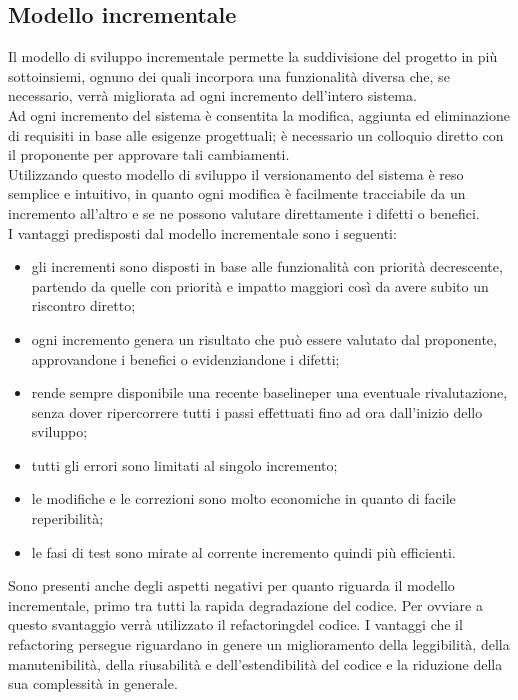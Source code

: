 \subsection{Modello incrementale}
Il modello di sviluppo incrementale permette la suddivisione del progetto in più sottoinsiemi,
ognuno dei quali incorpora una funzionalità diversa che, se necessario, verrà migliorata ad ogni incremento dell'intero 
sistema.  \\
Ad ogni incremento del sistema è consentita la modifica, aggiunta ed eliminazione di requisiti in base alle esigenze progettuali; 
è necessario un colloquio diretto con il proponente per approvare tali cambiamenti. \\
Utilizzando questo modello di sviluppo il versionamento del sistema è reso semplice e intuitivo, in quanto ogni modifica è facilmente tracciabile da un incremento all'altro e se ne possono valutare direttamente i difetti o benefici.\\
I vantaggi predisposti dal modello incrementale sono i seguenti:
\begin{itemize}
	\item gli incrementi sono disposti in base alle funzionalità con priorità decrescente, partendo da quelle con priorità e impatto maggiori
	così da avere subito un riscontro diretto;
	\item ogni incremento genera un risultato che può essere valutato dal proponente, approvandone i benefici o evidenziandone i difetti;
	\item rende sempre disponibile una recente baseline\glosp per una eventuale rivalutazione, senza dover ripercorrere tutti i passi effettuati fino ad ora dall'inizio dello sviluppo;
	\item tutti gli errori sono limitati al singolo incremento;
	\item le modifiche e le correzioni sono molto economiche in quanto di facile reperibilità;
	\item le fasi di test sono mirate al corrente incremento quindi più efficienti.
\end{itemize}
Sono presenti anche degli aspetti negativi per quanto riguarda il modello incrementale, primo tra tutti la rapida degradazione del codice. Per ovviare a questo svantaggio verrà utilizzato il refactoring\glosp del codice. I vantaggi che il refactoring persegue riguardano in genere un miglioramento della leggibilità, della manutenibilità, della riusabilità e dell'estendibilità del codice e la riduzione della sua complessità in generale.


